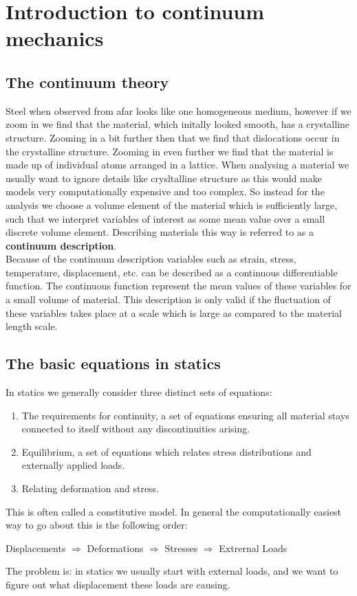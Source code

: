 \documentclass[11pt, a4paper]{article}
\numberwithin{equation}{section}
\begin{document}
\section{Introduction to continuum mechanics}


\subsection{The continuum theory}
Steel when observed from afar looks like one homogeneous medium, however if we zoom in we find that the material, which initally looked smooth, has a crystalline structure. Zooming in a bit further then that we find that dislocations occur in the crystalline structure. Zooming in even further we find that the material is made up of individual atoms arranged in a lattice. When analysing a material we usually want to ignore details like crysltalline structure as this would make models very computationally expensive and too complex. So instead for the analysis we choose a volume element of the material which is sufficiently large, such that we interpret variables of interest as some mean value over a small discrete volume element. Describing materials this way is referred to as a \textbf{continuum description}.\\
Because of the continuum description variables such as strain, stress, temperature, displacement, etc. can be described as a continuous differentiable function. The continuous function represent the mean values of these variables for a small volume of material. This description is only valid if the fluctuation of these variables takes place at a scale which is large as compared to the material length scale.


\subsection{The basic equations in statics}
In statics we generally consider three distinct sets of equations:
\begin{enumerate}
  \item The requirements for continuity, a set of equations ensuring all material stays connected to itself without any discontinuities arising.
  \item Equilibrium, a set of equations which relates stress distributions and externally applied loads.
  \item Relating deformation and stress.
\end{enumerate}
This is often called a constitutive model. In general the computationally easiest way to go about this is the following order:\\
\begin{center}
  Displacements $\Rightarrow$ Deformations $\Rightarrow$ Stresses $\Rightarrow$ Extrernal Loads
\end{center}
The problem is: in statics we usually start with external loads, and we want to figure out what displacement these loads are causing.
\end{document}
